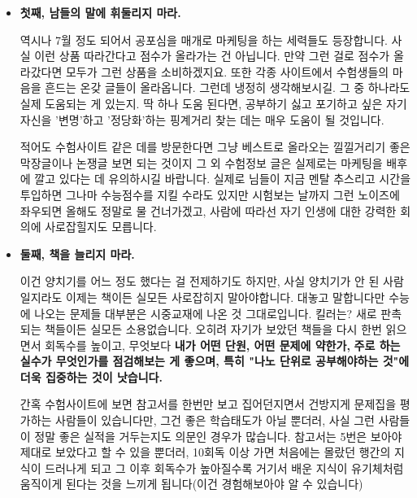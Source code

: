\begin{itemize}
    \item \textbf{첫째, 남들의 말에 휘둘리지 마라.}
    \vspace{5mm}

    역시나 7월 정도 되어서 공포심을 매개로 마케팅을 하는 세력들도 등장합니다.
    사실 이런 상품 따라간다고 점수가 올라가는 건 아닙니다. 만약 그런 걸로 점수가 올라갔다면 모두가 그런 상품을 소비하겠지요.
    또한 각종 사이트에서 수험생들의 마음을 흔드는 온갖 글들이 올라옵니다. 그런데 냉정히 생각해보시길. 그 중 하나라도 실제 도움되는 게 있는지.
    딱 하나 도움 된다면, 공부하기 싫고 포기하고 싶은 자기 자신을 '변명'하고 '정당화'하는 핑계거리 찾는 데는 매우 도움이 될 것입니다.
    \vspace{5mm}

    적어도 수험사이트 같은 데를 방문한다면 그냥 베스트로 올라오는 낄낄거리기 좋은 막장글이나 논쟁글 보면 되는 것이지
    그 외 수험정보 글은 실제로는 마케팅을 배후에 깔고 있다는 데 유의하시길 바랍니다.
    실제로 님들이 지금 멘탈 추스리고 시간을 투입하면 그나마 수능점수를 지킬 수라도 있지만 시험보는 날까지 그런 노이즈에 좌우되면
    올해도 정말로 물 건너가겠고, 사람에 따라선 자기 인생에 대한 강력한 회의에 사로잡힐지도 모릅니다.
    \vspace{5mm}

    \item \textbf{둘째, 책을 늘리지 마라.}
    \vspace{5mm}

    이건 양치기를 어느 정도 했다는 걸 전제하기도 하지만, 사실 양치기가 안 된 사람일지라도 이제는 책이든 실모든 사로잡히지 말아야합니다.
    대놓고 말합니다만 수능에 나오는 문제들 대부분은 시중교재에 나온 것 그대로입니다. 킬러는? 새로 판촉되는 책들이든 실모든 소용없습니다.
    오히려 자기가 보았던 책들을 다시 한번 읽으면서 회독수를 높이고, 무엇보다 \textbf{내가 어떤 단원, 어떤 문제에 약한가,}
    \textbf{주로 하는 실수가 무엇인가를 점검해보는 게 좋으며, 특히 "나노 단위로 공부해야하는 것"에 더욱 집중하는 것이 낫습니다.}
    \vspace{5mm}

    간혹 수험사이트에 보면 참고서를 한번만 보고 집어던지면서 건방지게 문제집을 평가하는 사람들이 있습니다만,
    그건 좋은 학습태도가 아닐 뿐더러, 사실 그런 사람들이 정말 좋은 실적을 거두는지도 의문인 경우가 많습니다.
    참고서는 5번은 보아야 제대로 보았다고 할  수 있을 뿐더러, 10회독 이상 가면 처음에는 몰랐던 행간의 지식이 드러나게 되고
    그 이후 회독수가 높아질수록 거기서 배운 지식이 유기체처럼 움직이게 된다는 것을 느끼게 됩니다(이건 경험해보아야 알 수 있습니다)
    \vspace{5mm}


\end{itemize}
